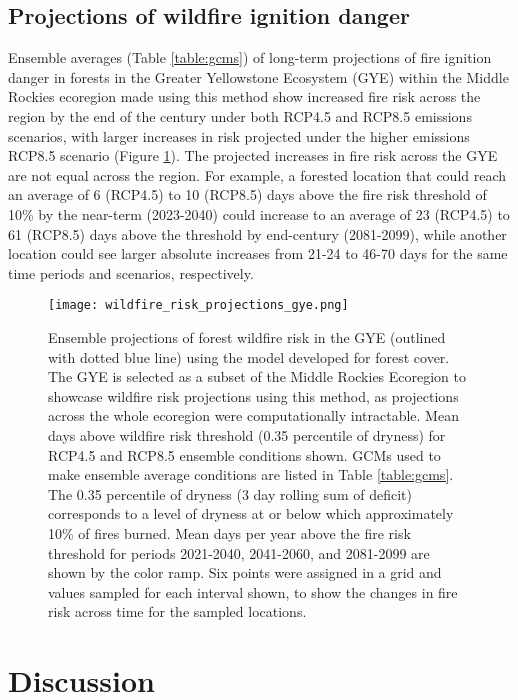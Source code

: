 \documentclass[11p]{article}
\begin{document}
\subsection{Projections of wildfire ignition danger}

Ensemble averages (Table \ref{table:gcms}) of long-term projections of fire ignition danger in forests in the Greater Yellowstone Ecosystem (GYE) within the Middle Rockies ecoregion made using this method show increased fire risk across the region by the end of the century under both RCP4.5 and RCP8.5 emissions scenarios, with larger increases in risk projected under the higher emissions RCP8.5 scenario (Figure \ref{fig:projected-risk}). The projected increases in fire risk across the GYE are not equal across the region. For example, a forested location that could reach an average of 6 (RCP4.5) to 10 (RCP8.5) days above the fire risk threshold of 10\% by the near-term (2023-2040) could increase to an average of 23 (RCP4.5) to 61 (RCP8.5) days above the threshold by end-century (2081-2099), while another location could see larger absolute increases from 21-24 to 46-70 days for the same time periods and scenarios, respectively.

\begin{figure}[htbp]
  \centering
  \texttt{[image: wildfire\_risk\_projections\_gye.png]}
  \caption{Ensemble projections of forest wildfire risk in the GYE (outlined with dotted blue line) using the model developed for forest cover. The GYE is selected as a subset of the Middle Rockies Ecoregion to showcase wildfire risk projections using this method, as projections across the whole ecoregion were computationally intractable. Mean days above wildfire risk threshold (0.35 percentile of dryness) for RCP4.5 and RCP8.5 ensemble conditions shown. GCMs used to make ensemble average conditions are listed in Table \ref{table:gcms}. The 0.35 percentile of dryness (3 day rolling sum of deficit) corresponds to a level of dryness at or below which approximately 10\% of fires burned. Mean days per year above the fire risk threshold for periods 2021-2040, 2041-2060, and 2081-2099 are shown by the color ramp. Six points were assigned in a grid and values sampled for each interval shown, to show the changes in fire risk across time for the sampled locations.}
  \label{fig:projected-risk}
\end{figure}


\section{Discussion}
\end{document}
